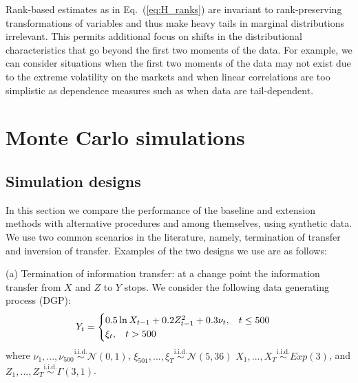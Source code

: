 Rank-based estimates as in Eq.~(\ref{eq:H_ranks}) are invariant to rank-preserving transformations of variables and thus make heavy tails in marginal distributions irrelevant. This permits additional focus on shifts in the distributional characteristics that go beyond the first two moments of the data. For example, we can consider situations when the first two moments of the data may not exist due to the extreme volatility on the markets and when linear correlations are too simplistic as dependence measures such as when data are tail-dependent. 

\section{Monte Carlo simulations}\label{sec:sims}

\subsection{Simulation designs}\label{subsec:sim_design}

In this section we compare the performance of the baseline and extension methods with alternative procedures and among themselves, using synthetic data. We use two common scenarios in the literature, namely, termination of transfer and inversion of transfer. Examples of the two designs we use are as follows: 

(a) Termination of information transfer: at a change point the information transfer from $X$ and $Z$ to $Y$ stops. We consider the following data generating process (DGP): 
\begin{equation*} Y_t = 
    \begin{cases}
      0.5 \ln X_{t-1} + 0.2 Z_{t-1}^2 + 0.3 \nu_t, \hspace{0.3cm} t \leq 500\\
      \xi_t, \hspace{0.3cm} t > 500
    \end{cases}\,
\end{equation*}
where $\nu_1, ... , \nu_{500} \overset{\mathrm{i.i.d.}}{\sim} \mathcal{N}(0,1)$, $\xi_501, ... , \xi_T \overset{\mathrm{i.i.d.}}{\sim} \mathcal{N}(5,36)$ $X_1, ... , X_T  \overset{\mathrm{i.i.d.}}{\sim} Exp(3)$, and $Z_1, ... , Z_T  \overset{\mathrm{i.i.d.}}{\sim} \Gamma(3,1)$.

